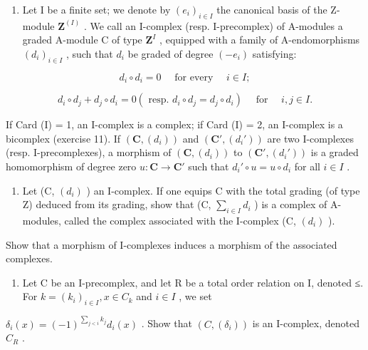 \begin{enumerate}
\def\labelenumi{\arabic{enumi})}
\setcounter{enumi}{12}
\tightlist
\item
  Let I be a finite set; we denote by \((e_i)_{i\in I}\) the canonical basis of the Z-module \(\mathbf{Z}^{(I)}\) . We call an I-complex (resp. I-precomplex) of A-modules a graded A-module C of type \(\mathbf{Z}^{I}\) , equipped with a family of A-endomorphisms \((d_i)_{i\in I}\) , such that \(d_i\) be graded of degree \((-e_i)\) satisfying:
\end{enumerate}

\[
d _ {i} \circ d _ {i} = 0 \quad \text { for every } \quad i \in I;
\]

\[
d _ {i} \circ d _ {j} + d _ {j} \circ d _ {i} = 0 (\text { resp. } d _ {i} \circ d _ {j} = d _ {j} \circ d _ {i}) \quad \text { for } \quad i, j \in I.
\]

If Card (I) = 1, an I-complex is a complex; if Card (I) = 2, an I-complex is a bicomplex (exercise 11). If \((\mathbf{C}, (d_i))\) and \((\mathbf{C}', (d_i'))\) are two I-complexes (resp. I-precomplexes), a morphism of \((\mathbf{C}, (d_i))\) to \((\mathbf{C}', (d_i'))\) is a graded homomorphism of degree zero \(u: \mathbf{C} \to \mathbf{C}'\) such that \(d_i' \circ u = u \circ d_i\) for all \(i \in I\) .

\begin{enumerate}
\def\labelenumi{\alph{enumi})}
\tightlist
\item
  Let (C, \((d_i)\) ) an I-complex. If one equips C with the total grading (of type Z) deduced from its grading, show that (C, \(\sum_{i\in I}d_i\) ) is a complex of A-modules, called the complex associated with the I-complex (C, \((d_i)\) ).
\end{enumerate}

Show that a morphism of I-complexes induces a morphism of the associated complexes.

\begin{enumerate}
\def\labelenumi{\alph{enumi})}
\setcounter{enumi}{1}
\tightlist
\item
  Let C be an I-precomplex, and let R be a total order relation on I, denoted ≤. For \(k = (k_i)_{i \in I}, x \in C_k\) and \(i \in I\) , we set
\end{enumerate}

\(\delta_{i}(x) = (-1)^{\sum_{j < i} k_{j}} d_{i}(x)\) . Show that \((C, (\delta_{i}))\) is an I-complex, denoted \(C_{R}\) .

